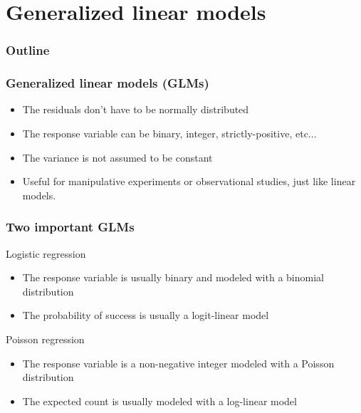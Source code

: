 \documentclass[color=usenames,dvipsnames]{beamer}\usepackage[]{graphicx}\usepackage[]{color}
\begin{document}
\section{Generalized linear models}



\begin{frame}[plain]
  \frametitle{Outline}
  \Large
  \tableofcontents[currentsection]
\end{frame}




\begin{frame}
  \frametitle{Generalized linear models (GLMs)}
  \large
  \begin{itemize}%
    \item<2-> The residuals don't have to be normally distributed
    \item<3-> The response variable can be binary, integer,
      strictly-positive, etc...
    \item<4-> The variance is not assumed to be constant
    \item<5-> Useful for manipulative experiments or observational
      studies, just like linear models.
  \end{itemize}
  \vfill
\end{frame}



\begin{frame}
  \frametitle{Two important GLMs}
  {Logistic regression \\}
  \begin{itemize}
    \item The response variable is usually binary and modeled with a
      binomial distribution
    \item The probability of success is usually a logit-linear
      model
  \end{itemize}
  \pause
  \vfill
  {Poisson regression \\}
  \begin{itemize}
    \item The response variable is a non-negative integer modeled with
      a Poisson distribution
    \item The expected count is usually modeled with a log-linear
      model
  \end{itemize}
  \vfill
\end{frame}
\end{document}
